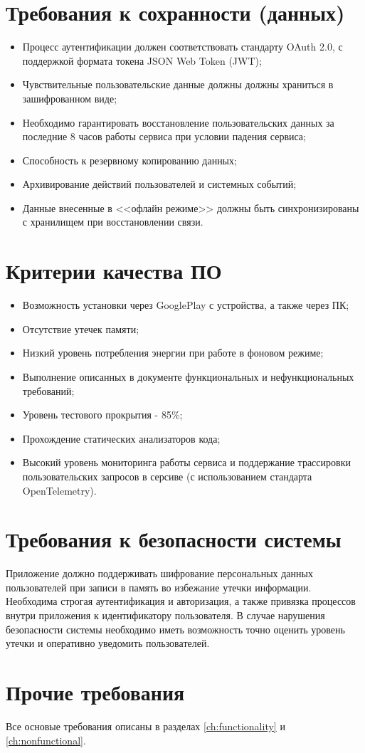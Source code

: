 \section{Требования к сохранности (данных)}
\begin{itemize}
    \item Процесс аутентификации должен соответствовать стандарту OAuth 2.0, с поддержкой формата токена JSON Web Token (JWT);
    \item Чувствительные пользовательские данные должны должны храниться в зашифрованном виде;
    \item Необходимо гарантировать восстановление пользовательских данных за последние 8 часов работы сервиса при условии падения сервиса;
    \item Способность к резервному копированию данных;
    \item Архивирование действий пользователей и системных событий;
    \item Данные внесенные в <<офлайн режиме>> должны быть синхронизированы с хранилищем при восстановлении связи.
\end{itemize}

\section{Критерии качества ПО}
\begin{itemize}
    \item Возможность установки через GooglePlay с устройства, а также через ПК;
    \item Отсутствие утечек памяти;
    \item Низкий уровень потребления энергии при работе в фоновом режиме;
    \item Выполнение описанных в документе функциональных и нефункциональных требований;
    \item Уровень тестового прокрытия - 85\%;
    \item Прохождение статических анализаторов кода;
    \item Высокий уровень мониторинга работы сервиса и поддержание трассировки пользовательских запросов в серсиве (с использованием стандарта OpenTelemetry).
\end{itemize}


\section{Требования к безопасности системы}
Приложение должно поддерживать шифрование персональных данных пользователей при записи в память во избежание утечки информации. Необходима строгая аутентификация и авторизация, а также привязка процессов внутри приложения к идентификатору пользователя. В случае нарушения безопасности системы необходимо иметь возможность точно оценить уровень утечки и оперативно уведомить пользователей. 


\section{Прочие требования}

Все основые требования описаны в разделах \ref{ch:functionality} и \ref{ch:nonfunctional}.